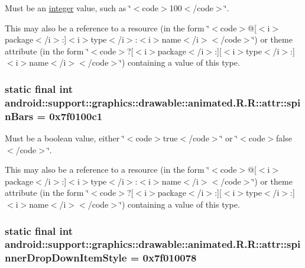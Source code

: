 Must be an \hyperlink{classandroid_1_1support_1_1graphics_1_1drawable_1_1animated_1_1_r_1_1integer}{integer} value, such as \char`\"{}$<$code$>$100$<$/code$>$\char`\"{}. 

This may also be a reference to a resource (in the form \char`\"{}$<$code$>$@\mbox{[}$<$i$>$package$<$/i$>$:\mbox{]}$<$i$>$type$<$/i$>$:$<$i$>$name$<$/i$>$$<$/code$>$\char`\"{}) or theme attribute (in the form \char`\"{}$<$code$>$?\mbox{[}$<$i$>$package$<$/i$>$:\mbox{]}\mbox{[}$<$i$>$type$<$/i$>$:\mbox{]}$<$i$>$name$<$/i$>$$<$/code$>$\char`\"{}) containing a value of this type. \hypertarget{classandroid_1_1support_1_1graphics_1_1drawable_1_1animated_1_1_r_1_1attr_2ae02a4981aab4d3c390f43daa5524af}{
\subsubsection[{spinBars}]{\setlength{\rightskip}{0pt plus 5cm}static final int android::support::graphics::drawable::animated.R.R::attr::spinBars = 0x7f0100c1}}
\label{classandroid_1_1support_1_1graphics_1_1drawable_1_1animated_1_1_r_1_1attr_2ae02a4981aab4d3c390f43daa5524af}


Must be a boolean value, either \char`\"{}$<$code$>$true$<$/code$>$\char`\"{} or \char`\"{}$<$code$>$false$<$/code$>$\char`\"{}. 

This may also be a reference to a resource (in the form \char`\"{}$<$code$>$@\mbox{[}$<$i$>$package$<$/i$>$:\mbox{]}$<$i$>$type$<$/i$>$:$<$i$>$name$<$/i$>$$<$/code$>$\char`\"{}) or theme attribute (in the form \char`\"{}$<$code$>$?\mbox{[}$<$i$>$package$<$/i$>$:\mbox{]}\mbox{[}$<$i$>$type$<$/i$>$:\mbox{]}$<$i$>$name$<$/i$>$$<$/code$>$\char`\"{}) containing a value of this type. \hypertarget{classandroid_1_1support_1_1graphics_1_1drawable_1_1animated_1_1_r_1_1attr_07b84ee6a565c5e24f74f6b6052492a1}{
\subsubsection[{spinnerDropDownItemStyle}]{\setlength{\rightskip}{0pt plus 5cm}static final int android::support::graphics::drawable::animated.R.R::attr::spinnerDropDownItemStyle = 0x7f010078}}
\label{classandroid_1_1support_1_1graphics_1_1drawable_1_1animated_1_1_r_1_1attr_07b84ee6a565c5e24f74f6b6052492a1}


